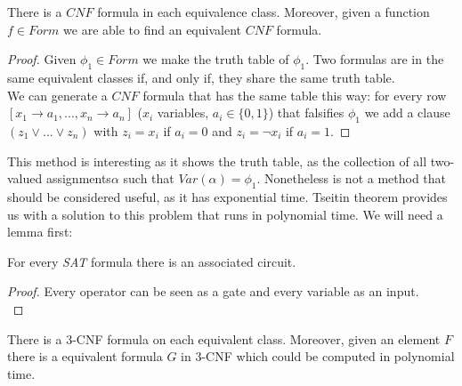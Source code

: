 \begin{proposition}
  There is a $CNF$ formula in each equivalence class. Moreover, given a function $f\in Form$ we are able to find an equivalent $CNF$ formula.
\end{proposition}
\begin{proof}
 Given $\phi_1 \in Form$ we make the truth table of $\phi_1$. Two formulas are in the same equivalent classes if, and only if, they share the same truth table. \\

  We can generate a $CNF$ formula that has the same table this way: for every row $[x_1\to a_1,...,x_n\to a_n]$ ($x_i$ variables, $a_i\in \{0,1\}$) that falsifies $\phi_1$ we add a clause $(z_1\vee ... \vee z_n)$ with $z_i = x_i$ if $a_i = 0$ and  $z_i =\neg x_i$ if $a_i = 1$.
\end{proof}


  This method is interesting as it shows the truth table, as the collection of all two-valued assignments$\alpha$ such that $Var(\alpha) = \phi_1$. Nonetheless is not a method that should be considered useful, as it has exponential time. Tseitin theorem provides us with a solution to this problem that runs in polynomial time. We will need a lemma first:

  \begin{lemma}
    For every \emph{SAT} formula there is an associated circuit.
  \end{lemma}
  \begin{proof}
    Every operator can be seen as a gate and every variable as an input.\\
  \end{proof}
  
  \begin{theorem} \label{the:Tseitin}
    There is a 3-CNF formula on each equivalent class. Moreover, given an element $F$  there is a equivalent formula $G$  in 3-CNF which could be computed in polynomial time. 
  \end{theorem}

